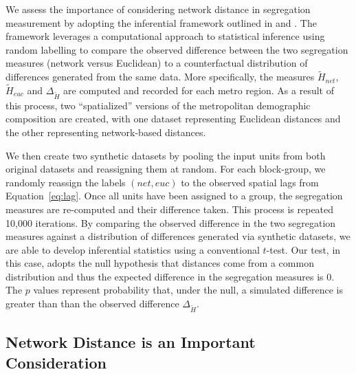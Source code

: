 \documentclass[
  10pt,
]{article}
\begin{document}
We assess the importance of considering network distance in segregation
measurement by adopting the inferential framework outlined in
\citet{rey2021ComparativeSpatial} and
\citet{cortes2020OpensourceFramework}. The framework leverages a
computational approach to statistical inference using random labelling
to compare the observed difference between the two segregation measures
(network versus Euclidean) to a counterfactual distribution of
differences generated from the same data. More specifically, the
measures \(\tilde{H}_{net}\), \(\tilde{H}_{euc}\) and
\(\Delta_{\tilde{H}}\) are computed and recorded for each metro region.
As a result of this process, two ``spatialized'' versions of the
metropolitan demographic composition are created, with one dataset
representing Euclidean distances and the other representing
network-based distances.

We then create two synthetic datasets by pooling the input units from
both original datasets and reassigning them at random. For each
block-group, we randomly reassign the labels \((net,euc)\) to the
observed spatial lags from Equation~\ref{eq:lag}. Once all units have
been assigned to a group, the segregation measures are re-computed and
their difference taken. This process is repeated 10,000 iterations. By
comparing the observed difference in the two segregation measures
against a distribution of differences generated via synthetic datasets,
we are able to develop inferential statistics using a conventional
\(t\)-test. Our test, in this case, adopts the null hypothesis that
distances come from a common distribution and thus the expected
difference in the segregation measures is 0. The \(p\) values represent
probability that, under the null, a simulated difference is greater than
than the observed difference \(\Delta_{\tilde{H}}\).

\hypertarget{network-distance-is-an-important-consideration}{%
\subsection{Network Distance is an Important
Consideration}\label{network-distance-is-an-important-consideration}}
\end{document}
